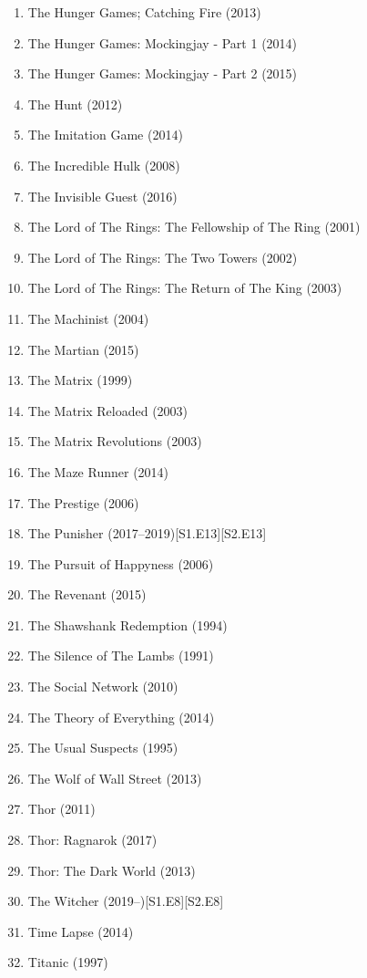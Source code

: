 \documentclass{article}
\begin{document}
\begin{enumerate}
	\item {\sc The Hunger Games; Catching Fire} (2013)
	\item {\sc The Hunger Games: Mockingjay - Part 1} (2014)
	\item {\sc The Hunger Games: Mockingjay - Part 2} (2015)
	\item {\sc The Hunt} (2012)
	\item {\sc The Imitation Game} (2014)
	\item {\sc The Incredible Hulk} (2008)
	\item {\sc The Invisible Guest} (2016)
	\item {\sc The Lord of The Rings: The Fellowship of The Ring} (2001)
	\item {\sc The Lord of The Rings: The Two Towers} (2002)
	\item {\sc The Lord of The Rings: The Return of The King} (2003)
	\item {\sc The Machinist} (2004)
	\item {\sc The Martian} (2015)
	\item {\sc The Matrix} (1999)
	\item {\sc The Matrix Reloaded} (2003)
	\item {\sc The Matrix Revolutions} (2003)
	\item {\sc The Maze Runner} (2014)
	\item {\sc The Prestige} (2006)
	\item {\sc The Punisher} (2017--2019)\hfill[S1.E13][S2.E13]
	\item {\sc The Pursuit of Happyness} (2006)
	\item {\sc The Revenant} (2015)
	\item {\sc The Shawshank Redemption} (1994)
	\item {\sc The Silence of The Lambs} (1991)
	\item {\sc The Social Network} (2010)
	\item {\sc The Theory of Everything} (2014)
	\item {\sc The Usual Suspects} (1995)
	\item {\sc The Wolf of Wall Street} (2013)
	\item {\sc Thor} (2011)
	\item {\sc Thor: Ragnarok} (2017)
	\item {\sc Thor: The Dark World} (2013)
	\item The Witcher (2019--)\hfill[S1.E8][S2.E8]
	\item {\sc Time Lapse} (2014)
	\item {\sc Titanic} (1997)

\end{enumerate}
\end{document}
